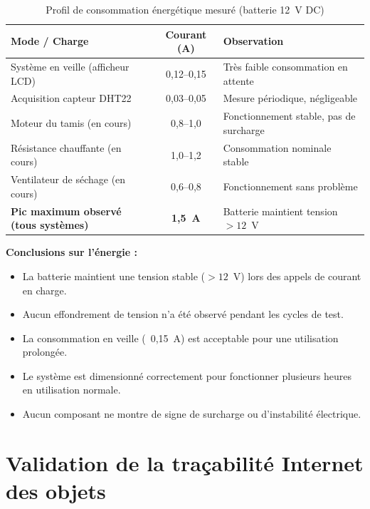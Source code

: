 \begin{table}[H]
    \caption{Profil de consommation énergétique mesuré (batterie 12~V DC)}
    \label{tab:validation_energie}
    \centering
\small
\renewcommand{\arraystretch}{1.5}
\begin{tabularx}{\textwidth}{|p{4cm}|C|L|}
\hline
{}
\textbf{Mode / Charge} & \textbf{Courant (A)} & \textbf{Observation} \\ \hline
Système en veille (afficheur LCD) & 0,12--0,15 & Très faible consommation en attente \\ \hline
Acquisition capteur DHT22 & 0,03--0,05 & Mesure périodique, négligeable \\ \hline
Moteur du tamis (en cours) & 0,8--1,0 & Fonctionnement stable, pas de surcharge \\ \hline
Résistance chauffante (en cours) & 1,0--1,2 & Consommation nominale stable \\ \hline
Ventilateur de séchage (en cours) & 0,6--0,8 & Fonctionnement sans problème \\ \hline
{}
\textbf{Pic maximum observé (tous systèmes)} & \textbf{1,5~A} & Batterie maintient tension $> 12$~V \\ \hline
\end{tabularx}
\end{table}

\textbf{Conclusions sur l'énergie :}
\begin{itemize}
    \item La batterie maintient une tension stable ($> 12$~V) lors des appels de courant en charge.
    \item Aucun effondrement de tension n'a été observé pendant les cycles de test.
    \item La consommation en veille (~0,15~A) est acceptable pour une utilisation prolongée.
    \item Le système est dimensionné correctement pour fonctionner plusieurs heures en utilisation normale.
    \item Aucun composant ne montre de signe de surcharge ou d'instabilité électrique.
\end{itemize}

\section{Validation de la traçabilité Internet des objets}

